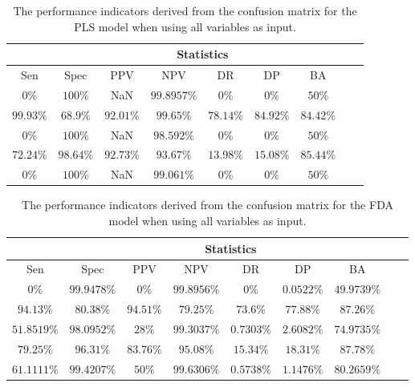 \begin{table}[!ht]
	\centering
	\begin{tabular}{|c|c|c|c|c|c|c|c|c|}
		\hline
		 & \multicolumn{7}{c|}{Statistics} \\ \hline
		Sen & Spec & PPV & NPV & DR & DP & BA \\ \hline
		$0\%$ & $100\%$ & NaN & $99.8957\%$ & $0\%$ & $0\%$ & $50\%$ \\ \hline
		$99.93\%$ & $68.9\%$ & $92.01\%$ & $99.65\%$ & $78.14\%$ & $84.92\%$ & $84.42\%$ \\ \hline
		$0\%$ & $100\%$ & NaN & $98.592\%$ & $0\%$ & $0\%$ & $50\%$ \\ \hline
		$72.24\%$ & $98.64\%$ & $92.73\%$ & $93.67\%$ & $13.98\%$ & $15.08\%$ & $85.44\%$ \\ \hline
		$0\%$ & $100\%$ & NaN & $99.061\%$ & $0\%$ & $0\%$ & $50\%$ \\ \hline
	\end{tabular}
	\caption{The performance indicators derived from the confusion matrix for the PLS model when using all variables as input.}
	\label{tab:cs:all:pls}
\end{table}

\begin{table}[!ht]
	\centering
	\begin{tabular}{|c|c|c|c|c|c|c|c|c|}
		\hline
		 & \multicolumn{7}{c|}{Statistics} \\ \hline
		Sen & Spec & PPV & NPV & DR & DP & BA \\ \hline
		$0\%$ & $99.9478\%$ & $0\%$ & $99.8956\%$ & $0\%$ & $0.0522\%$ & $49.9739\%$ \\ \hline
		$94.13\%$ & $80.38\%$ & $94.51\%$ & $79.25\%$ & $73.6\%$ & $77.88\%$ & $87.26\%$ \\ \hline
		$51.8519\%$ & $98.0952\%$ & $28\%$ & $99.3037\%$ & $0.7303\%$ & $2.6082\%$ & $74.9735\%$ \\ \hline
		$79.25\%$ & $96.31\%$ & $83.76\%$ & $95.08\%$ & $15.34\%$ & $18.31\%$ & $87.78\%$ \\ \hline
		$61.1111\%$ & $99.4207\%$ & $50\%$ & $99.6306\%$ & $0.5738\%$ & $1.1476\%$ & $80.2659\%$ \\ \hline
	\end{tabular}
	\caption{The performance indicators derived from the confusion matrix for the FDA model when using all variables as input.}
	\label{tab:cs:all:fda}
\end{table}

